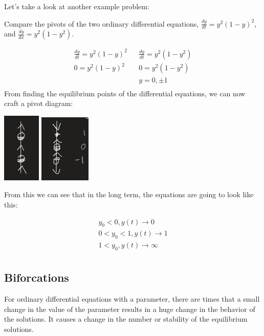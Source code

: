   Let's take a look at another example problem:

  \begin{problem}
    Compare the pivots of the two ordinary differential equations, $\frac{dy}{dt}=y^2(1-y)^2$, and $\frac{dy}{dx}=y^2(1-y^2)$.

    \begin{align}
      \frac{dy}{dt}=y^2(1-y)^2 && \frac{dy}{dt}=y^2(1-y^2)\\
      0=y^2(1-y)^2 && 0=y^2(1-y^2)\\
      && y=0,\pm1\\
    \end{align}
    From finding the equilibrium points of the differential equations, we can now craft a pivot diagram:\newline
    \begin{center}
    \includegraphics{resource/images/2.7 Example 2-1.jpg}
    \includegraphics{resource/images/2.7 Example 2-2.jpg}
    \end{center}

    From this we can see that in the long term, the equations are going to look like this:

    \begin{align}
      y_0<0,y(t)\to0\\
      0<y_0<1,y(t)\to1\\
      1<y_0,y(t)\to\infty\\
    \end{align}
  \end{problem}

  \subsection{Biforcations}

  For ordinary differential equations with a parameter, there are times that a small change in the value of the parameter results in a huge change in the behavior of the solutions. It causes a change in the number or stability of the equilibrium solutions.


